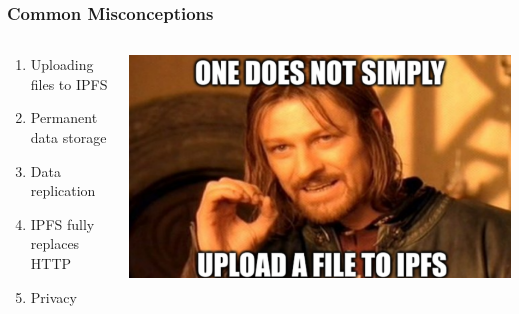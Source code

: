 \documentclass{../shipyard-slide}
\begin{document}
\begin{frame}
  \frametitle{Common Misconceptions}
  \begin{columns}
    \begin{column}{.38\textwidth}
  \begin{enumerate}
    \item Uploading files to IPFS
    \item Permanent data storage
    \item Data replication
    \item IPFS fully replaces HTTP
    \item Privacy
  \end{enumerate}
\end{column}
\begin{column}{.5\textwidth}
  \includegraphics[width=\textwidth]{resources/ipfs-upload.png}
\end{column}
\end{columns}
\end{frame}
\end{document}
